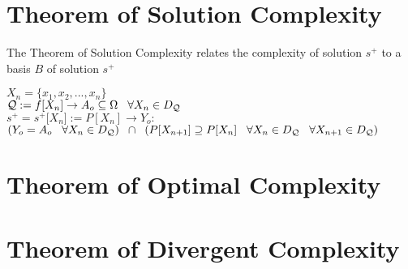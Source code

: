 \documentclass[11pt]{article}
\begin{document}
\section{Theorem of Solution Complexity}
The Theorem of Solution Complexity relates the complexity of solution $s^+$ to a basis $B$ of solution $s^+$
\begin{center}
\vspace{2mm}
$
X_n = \{x_1,x_2,...,x_n\}
$
\\ \vspace{4mm}
$
\mathcal{Q} := f \lbrack X_n \rbrack \rightarrow A_o \subseteq \Omega \hspace{3mm}\forall X_n \in D_{\mathcal{Q}}
$
\\ \vspace{4mm}
$
s^+ = s^+\lbrack X_n \rbrack := P[X_n] \rightarrow Y_o :
$
\\ \vspace{2mm}
$
(Y_o = A_o \hspace{3mm} \forall X_n \in D_{\mathcal{Q}}) \hspace{2mm} \cap \hspace{2mm} (P[X_{n+1}] \supseteq P[X_n] \hspace{3mm} \forall X_{n} \in D_{\mathcal{Q}} \hspace{3mm} \forall X_{n+1} \in D_{\mathcal{Q}})
$
\end{center}



\newpage
\section{Theorem of Optimal Complexity}





\newpage
\section{Theorem of Divergent Complexity}







%
\end{document}

